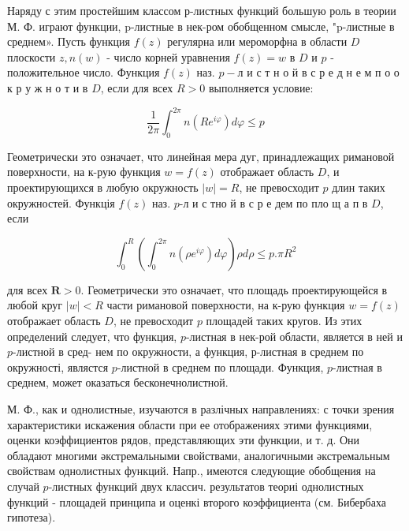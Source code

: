 \documentclass[10pt]{article}
\begin{document}
Наряду с этим простейшим классом р-листных функций большую роль в теории М. Ф. играют функции, p-листные в нек-ром обобщенном смысле, "p-листные в среднем». Пусть функция $f(z)$ регулярна или мероморфна в области $D$ плоскости $z, n(w)$ - число корней уравнения $f(z)=w$ в $D$ и $p$ - положительное число. Функция $f(z)$ наз. $p-л$ и с т н о й в с р е д н е м п о о к р у ж н о т и в $D$, если для всех $R>0$ выполняется условие:



\[

\frac{1}{2 \pi} \int_{0}^{2 \pi} n\left(R e^{i \varphi}\right) d \varphi \leqslant p

\]



Геометрически это означает, что линейная мера дуг, принадлежащих римановой поверхности, на к-рую функция $w=f(z)$ отображает область $D$, и проектирующихся в любую окружность $|w|=R$, не превосходит $p$ длин таких окружностей. Функція $f(z)$ наз. $p$-л и с тно й в с р е дем по пло щ а п в $D$, если



\[

\int_{0}^{R}\left(\int_{0}^{2 \pi} n\left(\rho e^{i \varphi}\right) d \varphi\right) \rho d \rho \leqslant p . \pi R^{2}

\]



для всех $\boldsymbol{R}>0$. Геометрически это означает, что площадь проектирующейся в любой круг $|w|<R$ части римановой поверхности, на к-рую функция $w=f(z)$ отображает область $D$, не превосходит $p$ площадей таких кругов. Из этих определений следует, что функция, $p$-листная в нек-рой области, является в ней и $p$-листной в сред- нем по окружности, а функция, р-листная в среднем по окружності, являстся $p$-листной в среднем по площади. Функция, $p$-листная в среднем, может оказаться бесконечнолистной.



М. Ф., как и однолистные, изучаются в разлічных направлениях: с точки зрения характеристики искажения области при ее отображениях этими функциями, оценки коэффициентов рядов, представляющих эти функции, и т. д. Они обладают многими әкстремальными свойствами, аналогичными әкстремальным свойствам однолистных функций. Напр., имеются следующие обобщения на случай $p$-листных функций двух классич. результатов теориі однолистных функций - площадей принципа и оценкі второго коэффициента (см. Бибербаха гипотеза).
\end{document}
